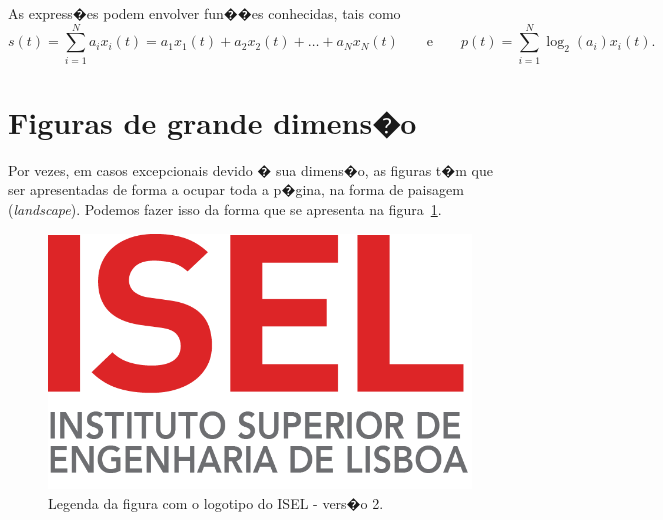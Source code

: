 As express�es podem envolver fun��es conhecidas, tais como
\begin{equation} \label{eq2}
\displaystyle s(t)=\sum_{i=1}^{N} a_i x_i(t) =a_1 x_1(t) +  a_2 x_2(t) + \ldots + a_N x_N(t) \qquad \mbox{e} \qquad \displaystyle p(t)=\sum_{i=1}^{N} \log_2(a_i) x_i(t).
\end{equation}


%
%
\section{Figuras de grande dimens�o} \label{sec25}
Por vezes, em casos excepcionais devido � sua dimens�o, as figuras t�m 
que ser apresentadas de forma a ocupar toda a p�gina, na forma de paisagem
(\emph{landscape}). Podemos fazer isso da forma que se apresenta na figura~\ref{fig:logotipo2}.


\begin{figure}[h]
\begin{center}
\includegraphics[scale=0.99,angle=90]{./figures/logoISEL.png}
\end{center}
\caption{Legenda da figura com o logotipo do ISEL - vers�o 2.}
\label{fig:logotipo2}
\end{figure}
	